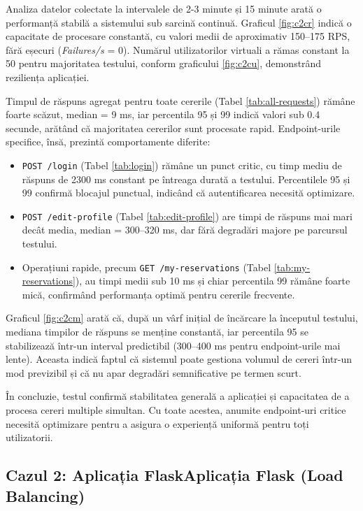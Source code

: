 \documentclass[12pt, a4paper, oneside, romanian]{teza-upb}
\begin{document}
Analiza datelor colectate la intervalele de 2-3 minute și 15 minute arată o performanță stabilă a sistemului sub sarcină continuă. Graficul \ref{fig:c2cr} indică o capacitate de procesare constantă, cu valori medii de aproximativ 150--175 RPS, fără eșecuri (\textit{Failures/s} = 0). Numărul utilizatorilor virtuali a rămas constant la 50 pentru majoritatea testului, conform graficului \ref{fig:c2cu}, demonstrând reziliența aplicației.

Timpul de răspuns agregat pentru toate cererile (Tabel \ref{tab:all-requests}) rămâne foarte scăzut, median = 9 ms, iar percentila 95 și 99 indică valori sub 0.4 secunde, arătând că majoritatea cererilor sunt procesate rapid. Endpoint-urile specifice, însă, prezintă comportamente diferite:

\begin{itemize}
    \item \texttt{POST /login} (Tabel \ref{tab:login}) rămâne un punct critic, cu timp mediu de răspuns de 2300 ms constant pe întreaga durată a testului. Percentilele 95 și 99 confirmă blocajul punctual, indicând că autentificarea necesită optimizare.
    \item \texttt{POST /edit-profile} (Tabel \ref{tab:edit-profile}) are timpi de răspuns mai mari decât media, median = 300--320 ms, dar fără degradări majore pe parcursul testului.
    \item Operațiuni rapide, precum \texttt{GET /my-reservations} (Tabel \ref{tab:my-reservations}), au timpi medii sub 10 ms și chiar percentila 99 rămâne foarte mică, confirmând performanța optimă pentru cererile frecvente.
\end{itemize}

Graficul \ref{fig:c2cm} arată că, după un vârf inițial de încărcare la începutul testului, mediana timpilor de răspuns se menține constantă, iar percentila 95 se stabilizează într-un interval predictibil (300--400 ms pentru endpoint-urile mai lente). Aceasta indică faptul că sistemul poate gestiona volumul de cereri într-un mod previzibil și că nu apar degradări semnificative pe termen scurt.

În concluzie, testul confirmă stabilitatea generală a aplicației și capacitatea de a procesa cereri multiple simultan. Cu toate acestea, anumite endpoint-uri critice necesită optimizare pentru a asigura o experiență uniformă pentru toți utilizatorii.







\subsection{Cazul 2: Aplicația Flask\textbf{Aplicația Flask } (Load Balancing)}
\end{document}
